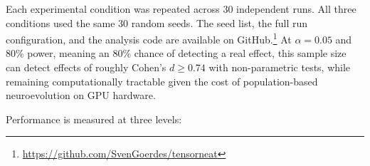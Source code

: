 \documentclass[12pt]{article}
\begin{document}
Each experimental condition was repeated across 30 independent runs. All three conditions used the same 30 random seeds.
The seed list, the full run configuration, and the analysis code are available on GitHub.\footnote{\url{https://github.com/SvenGoerdes/tensorneat}}
At $\alpha = 0.05$ and 80\% power, meaning an 80\% chance of detecting a real effect, this sample size can detect effects of roughly Cohen's $d \geq 0.74$ with non-parametric tests, while remaining computationally tractable given the cost of population-based neuroevolution on GPU hardware.

Performance is measured at three levels:
\end{document}

